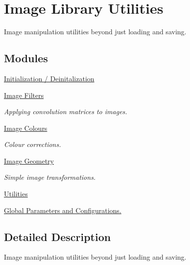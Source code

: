 \hypertarget{group___i_l_u}{\section{Image Library Utilities}
\label{group___i_l_u}
}


Image manipulation utilities beyond just loading and saving.  


\subsection*{Modules}
\begin{DoxyCompactItemize}
\item 
\hyperlink{group__ilu__setup}{Initialization / Deinitalization}
\item 
\hyperlink{group__ilu__filter}{Image Filters}
\begin{DoxyCompactList}\small\item\em Applying convolution matrices to images. \end{DoxyCompactList}\item 
\hyperlink{group__ilu__colour}{Image Colours}
\begin{DoxyCompactList}\small\item\em Colour corrections. \end{DoxyCompactList}\item 
\hyperlink{group__ilu__geometry}{Image Geometry}
\begin{DoxyCompactList}\small\item\em Simple image transformations. \end{DoxyCompactList}\item 
\hyperlink{group__ilu__util}{Utilities}
\item 
\hyperlink{group__ilu__state}{Global Parameters and Configurations.}
\end{DoxyCompactItemize}


\subsection{Detailed Description}
Image manipulation utilities beyond just loading and saving. 